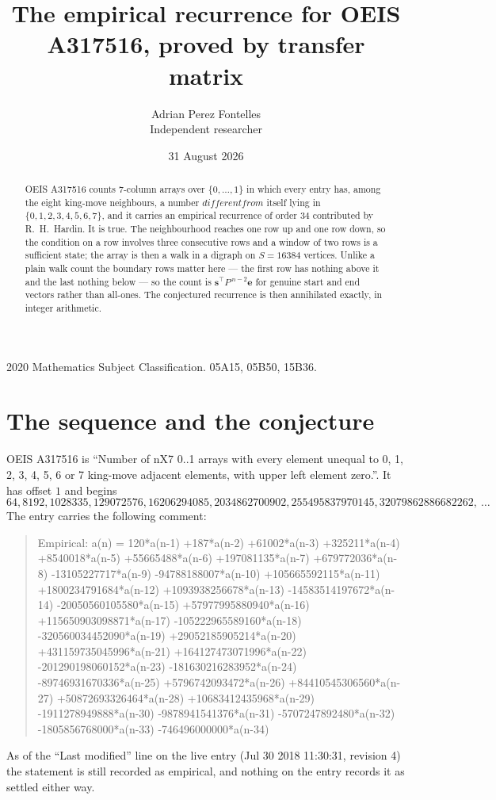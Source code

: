 \documentclass[11pt,a4paper]{article}
\title{The empirical recurrence for OEIS A317516, proved by transfer matrix}
\author{Adrian Perez Fontelles\\ \small Independent researcher}
\date{31 August 2026}
\theoremstyle{plain}
\theoremstyle{definition}
\begin{document}
\maketitle

\begin{abstract}
OEIS A317516 counts $7$-column arrays over $\{0,\dots,1\}$ in which every entry has,
among the eight king-move neighbours, a number $different from$ itself lying in $\{0,1,2,3,4,5,6,7\}$, and it carries an empirical
recurrence of order $34$ contributed by R.~H.~Hardin. It is true. The neighbourhood
reaches one row up and one row down, so the condition on a row involves three consecutive
rows and a window of two rows is a sufficient state; the array is then a walk in a digraph
on $S=16384$ vertices. Unlike a plain walk count the boundary rows matter here --- the first
row has nothing above it and the last nothing below --- so the count is
$\mathbf{s}^{\!\top}P^{\,n-2}\mathbf{e}$ for genuine start and end vectors rather than
all-ones. The conjectured recurrence is then annihilated exactly, in integer arithmetic.
\end{abstract}

\noindent\small 2020 Mathematics Subject Classification. 05A15, 05B50, 15B36.\normalsize

\section{The sequence and the conjecture}

OEIS A317516 is ``Number of nX7 0..1 arrays with every element unequal to 0, 1, 2, 3, 4, 5, 6 or 7 king-move adjacent elements, with upper left element zero.''. It has offset
$1$ and begins
\[
64, 8192, 1028335, 129072576, 16206294085, 2034862700902, 255495837970145, 32079862886682262,\ \dots
\]
The entry carries the following comment:
\begin{quote}\small
Empirical: a(n) = 120*a(n-1) +187*a(n-2) +61002*a(n-3) +325211*a(n-4) +8540018*a(n-5) +55665488*a(n-6) +197081135*a(n-7) +679772036*a(n-8) -13105227717*a(n-9) -94788188007*a(n-10) +105665592115*a(n-11) +1800234791684*a(n-12) +1093938256678*a(n-13) -14583514197672*a(n-14) -20050560105580*a(n-15) +57977995880940*a(n-16) +115650903098871*a(n-17) -105222965589160*a(n-18) -320560034452090*a(n-19) +29052185905214*a(n-20) +431159735045996*a(n-21) +164127473071996*a(n-22) -201290198060152*a(n-23) -181630216283952*a(n-24) -89746931670336*a(n-25) +5796742093472*a(n-26) +84410545306560*a(n-27) +50872693326464*a(n-28) +10683412435968*a(n-29) -1911278949888*a(n-30) -9878941541376*a(n-31) -5707247892480*a(n-32) -1805856768000*a(n-33) -746496000000*a(n-34)
\end{quote}
As of the ``Last modified'' line on the live entry (Jul 30 2018 11:30:31, revision
4) the statement is still recorded as empirical, and nothing on the entry
records it as settled either way.
\end{document}
